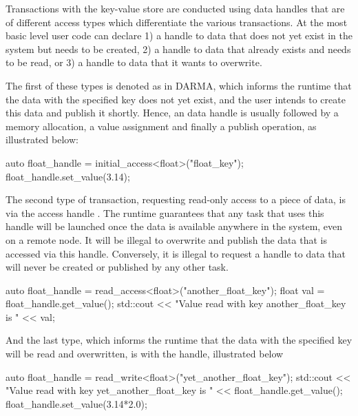 Transactions with the \gls{key-value store} are conducted using data handles that are of different access types which differentiate the 
various transactions. At the most basic level user code can declare 1) a handle to data that does not yet exist in the system
but needs to be created, 2) a handle to data that already exists and needs to
be read, or 3) a handle to data that it wants to overwrite. 

The first of these types is denoted as  in DARMA, which informs the runtime that the data with the 
specified key does not yet exist, and the user intends to create this data and publish it shortly. Hence, an 
data handle is usually followed by a memory allocation, a value assignment and finally a publish operation, as illustrated below: 
\begin{CppCode}
auto float_handle = initial_access<float>("float_key");
float_handle.set_value(3.14);
\end{CppCode}


The second type of transaction, requesting read-only access to a piece of data, is via the access handle . The runtime
guarantees that any task that uses this handle will be launched once the data is available anywhere in the system, even on a remote node.
It will be illegal to overwrite and publish the data that is accessed via this handle. Conversely, it is illegal to request a 
handle to data that will never be created or published by any other task.
\begin{CppCode}
auto float_handle = read_access<float>("another_float_key");
float val = float_handle.get_value();
std::cout << "Value read with key another_float_key is " << val;
\end{CppCode}

And the last type, which informs the runtime that the data with the specified key will be read and overwritten, is with the 
handle, illustrated below
\begin{CppCode}
auto float_handle = read_write<float>("yet_another_float_key");
std::cout << "Value read with key yet_another_float_key is " 
          << float_handle.get_value();
float_handle.set_value(3.14*2.0);
\end{CppCode}


